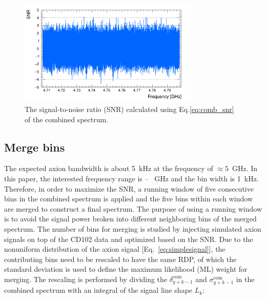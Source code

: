 \begin{figure}[hbt!]
    \centering
    \includegraphics[width=8.6cm]{figures/SNR_CombSpectrum_AxionRun_AllSteps_Rescan_SG4_W201_LqWeight.png}
    \caption{The signal-to-noise ratio (SNR) calculated using 
Eq.\eqref{eq:comb_snr} of the combined spectrum. }
    \label{fig:SNR_comb}
\end{figure}



\subsection{Merge bins}
\label{sec:merge}

The expected axion bandwidth is about 5~kHz at the frequency of 
$\approx5$~GHz. 
In this paper, the interested frequency range is \flo -- \fhi~GHz and the bin 
width is 1~kHz. Therefore, in order to maximize the SNR, a running window of 
five consecutive bins in the combined spectrum is applied and the five bins 
within each window are merged to construct a final spectrum.  
The purpose of using a running window is to avoid the signal power broken 
into different neighboring bins of the merged spectrum. 
The number of bins for merging is studied by injecting 
simulated axion signals on top of the CD102 data and optimized based 
on the SNR. 
Due to the nonuniform distribution of the axion signal 
[Eq.~\eqref{eq:simplesignal}],
the contributing bins need to be rescaled to have the same RDP, of which the 
standard deviation is used to define the maximum likelihood (ML)
weight for merging. The rescaling is performed by dividing the 
$\delta^\text{com}_{g+k-1}$ and $\sigma^\text{com}_{g+k-1}$ in the combined 
spectrum with an integral of the signal line shape $L_{k}$:

